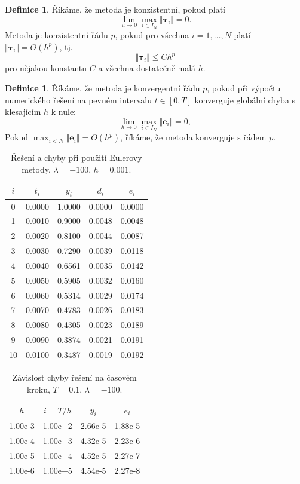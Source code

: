 \documentclass[a4paper, 12pt]{book}
\theoremstyle{definition}
\newtheorem{definition}[theorem]{Definice}
\def\to{\rightarrow}
\def\vc#1{\mathbf{\boldsymbol{#1}}}     %
\def\norm#1{\bigl\Vert#1\bigr\Vert} %
\begin{document}
\begin{definition}
 Říkáme, že metoda je konzistentní, pokud platí
 \[
   \lim_{h\to 0} \max_{i\in I_N} \norm{\vc \tau_i} = 0.
 \]
 Metoda je konzistentní řádu $p$, pokud pro všechna $i=1,\dots, N$ platí  $\norm{\vc\tau_i} = O (h^p)$, tj.
 \[
        \norm{\vc \tau_i} \le C h^p
 \]
pro nějakou konstantu $C$ a všechna dostatečně malá $h$.
\end{definition}

\begin{definition}
 Říkáme, že metoda je konvergentní řádu $p$, pokud při výpočtu numerického řešení na pevném intervalu $t \in [0,T]$ konverguje globální chyba
 s klesajícím $h$ k nule:
 \[
    \lim_{h\to 0} \max_{i\in I_N} \norm{\vc e_i} = 0,
 \]
 Pokud $\max_{i<N} \norm{\vc e_i} = O(h^p)$, říkáme, že metoda konverguje s řádem $p$.
\end{definition}


\begin{table}
\centering
\begin{tabular}{|c|c|c|c|c|}
\hline
$i$ & $t_i$ & $y_i$ & $d_i$ & $e_i$\\ 
\hline
0 & 0.0000 & 1.0000 & 0.0000 & 0.0000\\ 
\hline
1 & 0.0010 & 0.9000 & 0.0048 & 0.0048\\ 
\hline
2 & 0.0020 & 0.8100 & 0.0044 & 0.0087\\ 
\hline
3 & 0.0030 & 0.7290 & 0.0039 & 0.0118\\ 
\hline
4 & 0.0040 & 0.6561 & 0.0035 & 0.0142\\ 
\hline
5 & 0.0050 & 0.5905 & 0.0032 & 0.0160\\ 
\hline
6 & 0.0060 & 0.5314 & 0.0029 & 0.0174\\ 
\hline
7 & 0.0070 & 0.4783 & 0.0026 & 0.0183\\ 
\hline
8 & 0.0080 & 0.4305 & 0.0023 & 0.0189\\ 
\hline
9 & 0.0090 & 0.3874 & 0.0021 & 0.0191\\ 
\hline
10 & 0.0100 & 0.3487 & 0.0019 & 0.0192\\ 
\hline
\hline\end{tabular}
\label{table:reseni}
\caption{Řešení a chyby při použití Eulerovy metody, $\lambda=-100$, $h=0.001$.} 
\end{table}

 \begin{table}
\centering
\begin{tabular}{|c|c|c|c|}
\hline
$h$ & $i=T/h$ & $y_i$ & $e_i$\\ 
\hline
1.00e-3 & 1.00e+2 & 2.66e-5 & 1.88e-5\\ 
\hline
1.00e-4 & 1.00e+3 & 4.32e-5 & 2.23e-6\\ 
\hline
1.00e-5 & 1.00e+4 & 4.52e-5 & 2.27e-7\\ 
\hline
1.00e-6 & 1.00e+5 & 4.54e-5 & 2.27e-8\\ 
\hline
\hline\end{tabular}
\label{table:konvergence}
\caption{Závislost chyby řešení na časovém kroku, $T=0.1$, $\lambda=-100$.} 
\end{table}
\end{document}
